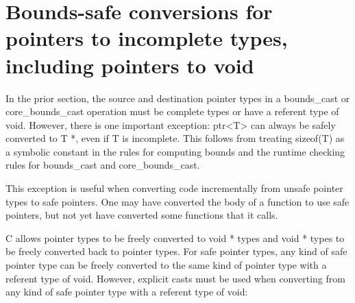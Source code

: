 \section{Bounds-safe conversions for pointers to incomplete types, including pointers to void}\label{bounds-safe-conversions-for-pointers-to-incomplete-types-including-pointers-to-void}

In the prior section, the source and destination pointer types in a
bounds\_cast or core\_bounds\_cast operation must be complete types or
have a referent type of void. However, there is one important exception:
ptr\textless{}T\textgreater{} can always be safely converted to T *,
even if T is incomplete. This follows from treating sizeof(T) as a
symbolic constant in the rules for computing bounds and the runtime
checking rules for bounds\_cast and core\_bounds\_cast.

This exception is useful when converting code incrementally from unsafe
pointer types to safe pointers. One may have converted the body of a
function to use safe pointers, but not yet have converted some functions
that it calls.

C allows pointer types to be freely converted to void * types and void *
types to be freely converted back to pointer types. For safe pointer
types, any kind of safe pointer type can be freely converted to the same
kind of pointer type with a referent type of void. However, explicit
casts must be used when converting from any kind of safe pointer type
with a referent type of void:

